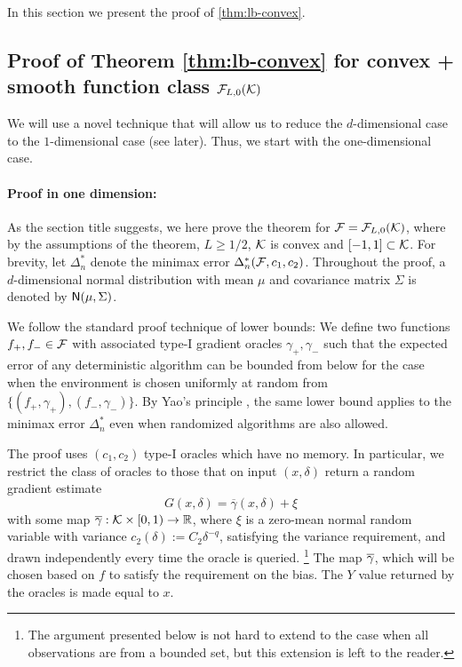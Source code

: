 In this section we present the proof of \cref{thm:lb-convex}.

\subsection{Proof of Theorem \ref{thm:lb-convex} for convex + smooth function class $\mathcal{F}_{L,0}(\mathcal{K})$}
\label{sec:appendix-lbconvex}
We will use a novel technique that will allow us to  reduce the $d$-dimensional case to the $1$-dimensional case (see later).
Thus, we start with the one-dimensional case.

\paragraph{Proof in one dimension:} 
As the section title suggests, we here prove the theorem for $\mathcal{F} = \mathcal{F}_{L,0}(\mathcal{K})$, where 
by the assumptions of the theorem, $L\ge 1/2$, $\mathcal{K}$ is convex and $[-1,1]\subset \mathcal{K}$.
For brevity, let $\Delta_n^{*}$ denote the minimax error $\Delta_n^*(\mathcal{F}, c_1,c_2)$. 
Throughout the proof, a $d$-dimensional normal distribution with mean $\mu$ and covariance matrix $\Sigma$ is denoted by $\mathsf{N}(\mu, \Sigma)$.

We follow the standard proof technique of lower bounds: We define two functions $f_+, f_- \in \mathcal{F}$ with associated type-I gradient oracles $\gamma_+,\gamma_-$ such that the expected error of any deterministic algorithm can be bounded from below for the case when the environment is chosen uniformly at random from $\{(f_+,\gamma_+),(f_-,\gamma_-)\}$. By Yao's principle
\citep{Yao77:FOCS}, the same lower bound applies to the minimax error $\Delta_n^{*}$ even when randomized algorithms are also allowed.

The proof uses $(c_1,c_2)$ type-I oracles which have no memory.
In particular, we restrict the class of oracles to those that on input $(x,\delta)$ return 
a random gradient estimate 
\begin{equation}
\label{eq:oracle}
G(x,\delta) = \overline{\gamma}(x,\delta) + \xi
\end{equation}
with some map $\overline{\gamma}: \mathcal{K} \times [0,1)\to \mathbb{R}$,
where $\xi$ is a zero-mean normal random variable with variance $c_2(\delta):= C_2 \delta^{-q}$, satisfying the variance requirement, and drawn independently every time the oracle is queried.%
\footnote{The argument presented below is not hard to extend to the case when all observations are from a bounded set,
but this extension is left to the reader.}
The map $\overline{\gamma}$, which will be chosen based on $f$ to satisfy the requirement on the bias.
The $Y$ value returned by the oracles is made equal to $x$.

